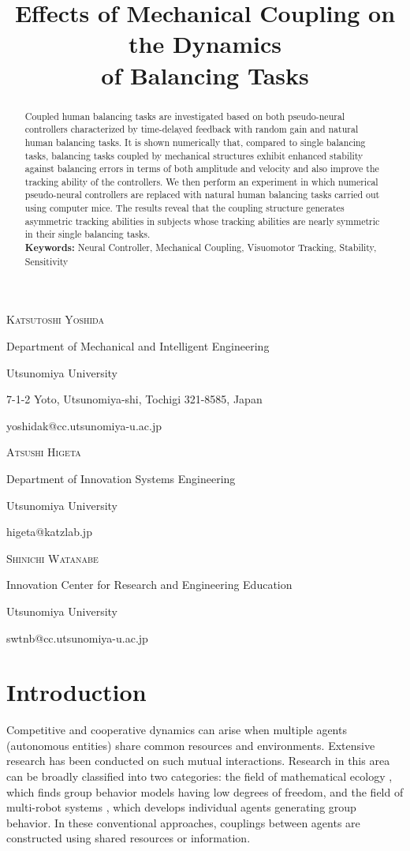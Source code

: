\documentclass[12pt,a4paper]{ijicic}
\title{Effects of Mechanical Coupling on the Dynamics\\
of Balancing Tasks}
\begin{document}
\maketitle

\centerline{\scshape  Katsutoshi Yoshida}
 \medskip
{\footnotesize
\centerline{Department of Mechanical and Intelligent Engineering}
\centerline{Utsunomiya University} 
\centerline{7-1-2 Yoto, Utsunomiya-shi, Tochigi 321-8585, Japan}
\centerline{yoshidak@cc.utsunomiya-u.ac.jp} }
\medskip

\centerline{\scshape  Atsushi Higeta}
 \medskip
{\footnotesize
\centerline{Department of Innovation Systems Engineering}
\centerline{Utsunomiya University} 
\centerline{higeta@katzlab.jp} }
\medskip

\centerline{\scshape  Shinichi Watanabe}
 \medskip
{\footnotesize
\centerline{Innovation Center for Research and Engineering Education}
\centerline{Utsunomiya University} 
\centerline{swtnb@cc.utsunomiya-u.ac.jp} }
\medskip

\maketitle

\begin{abstract}
 Coupled human balancing tasks are investigated based on both
 pseudo-neural controllers characterized by time-delayed feedback with
 random gain and natural human balancing tasks.  It is shown numerically
 that, compared to single balancing tasks, balancing tasks coupled
 by mechanical structures exhibit enhanced stability against balancing errors in
 terms of both amplitude and velocity and also improve the tracking
 ability of the controllers. We then perform an experiment in which 
 numerical pseudo-neural controllers are replaced with natural human
 balancing tasks carried out using computer mice.  The results reveal that
 the coupling structure generates asymmetric tracking abilities in
 subjects whose tracking abilities are nearly symmetric in their
 single balancing tasks.
\\
{\bf Keywords:} {
   Neural Controller,
   Mechanical Coupling,
   Visuomotor Tracking,
   Stability,
   Sensitivity
 }
\end{abstract}


\section{Introduction}

Competitive and cooperative dynamics can arise when multiple agents
(autonomous entities) share common resources and environments.
Extensive research has been conducted on such mutual interactions.
Research in this area can be broadly classified into two categories: the
field of mathematical ecology \cite{hofbauer01}, which finds group
behavior models having low degrees of freedom, and the field of
multi-robot systems \cite{DARS.en}, which develops individual agents
generating group behavior.
 In these conventional approaches, couplings between agents are
 constructed using shared resources or information.
\end{document}
